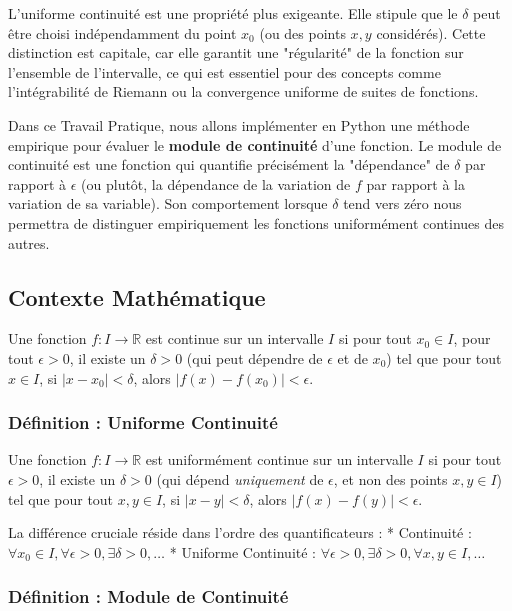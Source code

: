 \documentclass[12pt,a4paper]{report}
\begin{document}
L'uniforme continuité est une propriété plus exigeante. Elle stipule que le $\delta$ peut être choisi indépendamment du point $x_0$ (ou des points $x, y$ considérés). Cette distinction est capitale, car elle garantit une "régularité" de la fonction sur l'ensemble de l'intervalle, ce qui est essentiel pour des concepts comme l'intégrabilité de Riemann ou la convergence uniforme de suites de fonctions.

Dans ce Travail Pratique, nous allons implémenter en Python une méthode empirique pour évaluer le \textbf{module de continuité} d'une fonction. Le module de continuité est une fonction qui quantifie précisément la "dépendance" de $\delta$ par rapport à $\epsilon$ (ou plutôt, la dépendance de la variation de $f$ par rapport à la variation de sa variable). Son comportement lorsque $\delta$ tend vers zéro nous permettra de distinguer empiriquement les fonctions uniformément continues des autres.

\subsection{Contexte Mathématique}


Une fonction $f: I \to \mathbb{R}$ est continue sur un intervalle $I$ si pour tout $x_0 \in I$, pour tout $\epsilon > 0$, il existe un $\delta > 0$ (qui peut dépendre de $\epsilon$ et de $x_0$) tel que pour tout $x \in I$, si $|x - x_0| < \delta$, alors $|f(x) - f(x_0)| < \epsilon$.

\subsubsection{Définition : Uniforme Continuité}

Une fonction $f: I \to \mathbb{R}$ est uniformément continue sur un intervalle $I$ si pour tout $\epsilon > 0$, il existe un $\delta > 0$ (qui dépend \textit{uniquement} de $\epsilon$, et non des points $x, y \in I$) tel que pour tout $x, y \in I$, si $|x - y| < \delta$, alors $|f(x) - f(y)| < \epsilon$.

La différence cruciale réside dans l'ordre des quantificateurs :
*   Continuité : $\forall x_0 \in I, \forall \epsilon > 0, \exists \delta > 0, \dots$
*   Uniforme Continuité : $\forall \epsilon > 0, \exists \delta > 0, \forall x, y \in I, \dots$

\subsubsection{Définition : Module de Continuité}
\end{document}
